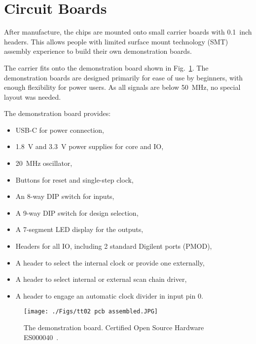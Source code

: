 \section{Circuit Boards}
\label{sec:circuit_board}
After manufacture, the chips are mounted onto small carrier boards with 0.1~inch headers. This allows people with limited surface mount technology (SMT) assembly experience to build their own demonstration boards.

The carrier fits onto the demonstration board shown in Fig.~\ref{fig:demonstration_board}. The demonstration boards are designed primarily for ease of use by beginners, with enough flexibility for power users. As all signals are below \qty{50}{\MHz}, no special layout was needed.

The demonstration board provides:
\begin{itemize}
\item USB-C for power connection,
\item \qty{1.8}{\V} and \qty{3.3}{\V} power supplies for core and IO,
\item \qty{20}{\MHz} oscillator,
\item Buttons for reset and single-step clock,
\item An 8-way DIP switch for inputs,
\item A 9-way DIP switch for design selection,
\item A 7-segment LED display for the outputs,
\item Headers for all IO, including 2 standard Digilent ports (PMOD),
\item A header to select the internal clock or provide one externally,
\item A header to select internal or external scan chain driver,
\item A header to engage an automatic clock divider in input pin 0.
\end{itemize}

\begin{figure}[!t]
\centering
\texttt{[image: ./Figs/tt02 pcb assembled.JPG]}
\caption{The demonstration board. Certified Open Source Hardware ES000040~\cite{oshwacertification}.}
\label{fig:demonstration_board}
\end{figure}
